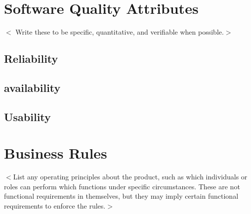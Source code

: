 \section{Software Quality Attributes}
$<$ Write these to be specific, quantitative, and verifiable when possible.$>$
\subsection {Reliability}
\subsection {availability}
\subsection {Usability}


\section{Business Rules}
$<$List any operating principles about the product, such as which individuals or
roles can perform which functions under specific circumstances. These are not
functional requirements in themselves, but they may imply certain functional
requirements to enforce the rules.$>$
